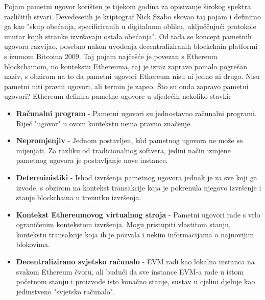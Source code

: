 \documentclass[times, utf8, diplomski]{fer}
\begin{document}
Pojam pametni ugovor korišten je tijekom godina za opisivanje širokog spektra različitih stvari. Devedesetih je kriptograf Nick Szabo skovao taj pojam i definirao ga kao "skup obećanja, specificiranih u digitalnom obliku, uključčujući protokole unutar kojih stranke izvršavaju ostala obećanja". Od tada se koncept pametnih ugovora razvijao,  posebno nakon uvođenja decentraliziranih blockchain platformi s izumom Bitcoina 2009. Taj pojam najčešće je povezan s Ethereum blockchainom, no kontekstu Ethereuma, taj je izraz zapravo pomalo pogrešan naziv, s obzirom na to da pametni ugovori Ethereum nisu ni jedno ni drugo. Nisu pametni niti pravni ugovori, ali termin je zapeo.
Što su onda zapravo pametni ugovori? Ethereum definira pametne ugovore u sljedećih nekoliko stavki:

\begin{itemize}

\item \textbf{Računalni program} - Pametni ugovori su jednostavno računalni programi. Riječ "ugovor" u ovom kontekstu nema pravno značenje.

\item \textbf{Nepromjenjiv} - Jednom postavljen, kôd pametnog ugovora ne može se mijenjati. Za razliku od tradicionalnog softvera, jedini način izmjene pametnog ugovora je postavljanje nove instance.

\item \textbf{Deterministiki} - Ishod izvršenja pametnog ugovora jednak je za sve koji ga izvode, s obzirom na kontekst transakcije koja je pokrenula njegovo izvršenje i stanje blockchaina u trenutku izvršenja.

\item \textbf{Kontekst Ethereumovog virtualnog stroja} - Pametni ugovori rade s vrlo ograničenim kontekstom izvršenja. Mogu pristupiti vlastitom stanju, kontekstu transakcije koja ih je pozvala i nekim informacijama o najnovijim blokovima.

\item \textbf{Decentralizirano svjetsko računalo} - EVM radi kao lokalna instanca na svakom Ethereum čvoru, ali budući da sve instance EVM-a rade u istom početnom stanju i proizvode isto konačno stanje, sustav u cjelini djeluje kao jedinstveno "svjetsko računalo".

\end{itemize}
\end{document}
